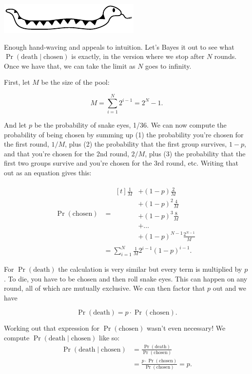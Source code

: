 \documentclass[article,twocolumn]{memoir}
\newcommand{\snakedivider}{
\vspace{.2em}
\begin{center}
\includegraphics[width=.25\linewidth]{snake}
\end{center}
\vspace{.1em}
}
\begin{document}
\snakedivider

Enough hand-waving and appeals to intuition.
Let's Bayes it out to see what 
$\Pr(\text{death} \mid \text{chosen})$
is exactly, in the version where we stop after $N$ rounds.
Once we have that, we can take the limit as $N$ goes to infinity.

First, let $M$ be the size of the pool:

$$M = \sum_{i=1}^{N} 2^{i-1} = 2^N-1.$$

And let $p$ be the probability of snake eyes, 1/36.
We can now compute the probability of being chosen by summing up 
(1) the probability you're chosen for the first round, $1/M$, plus 
(2) the probability that the first group survives, $1-p$, and that you're chosen for the 2nd round, $2/M$, plus 
(3) the probability that the first two groups survive and you're chosen for the 3rd round, etc.
Writing that out as an equation gives this:

\begin{align*}
\Pr(\text{chosen}) & = 
\begin{aligned}[t]
\tfrac{1}{M} & + (1-p)      \tfrac{2}{M} \\
             & + (1-p)^2    \tfrac{4}{M} \\
             & + (1-p)^3    \tfrac{8}{M} \\
             & + \ldots                  \\
             & + (1-p)^{N-1}\frac{2^{N-1}}{M}
\end{aligned} \\
& = \sum_{i=1}^{N} \tfrac{1}{M} 2^{i-1}(1-p)^{i-1}.
\end{align*}

For $\Pr(\text{death})$ the calculation is very similar but every term is multiplied by $p$.
To die, you have to be chosen and then roll snake eyes.
This can happen on any round, all of which are mutually exclusive.
We can then factor that $p$ out and we have

$$
\Pr(\text{death}) = p\cdot\Pr(\text{chosen}).
$$

Working out that expression for $\Pr(\text{chosen})$ wasn't even necessary!
We compute $\Pr(\text{death} \mid \text{chosen})$ like so:
\begin{equation*}
\begin{split}
\Pr(\text{death} \mid \text{chosen}) & = 
\frac{\Pr(\text{death})}{\Pr(\text{chosen})} \\
& = \frac{p\cdot\Pr(\text{chosen})}{\Pr(\text{chosen})} = 
p.
\end{split}
\end{equation*}
\end{document}
